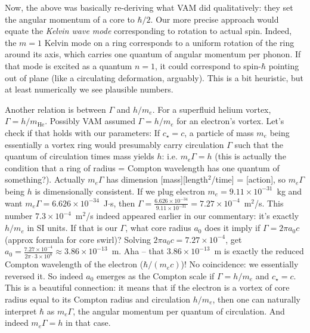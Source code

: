 \documentclass[12pt]{article}
\begin{document}
Now, the above was basically re-deriving what VAM did qualitatively: they set the angular momentum of a core to $\hbar/2$. Our more precise approach would equate the \textit{Kelvin wave mode} corresponding to rotation to actual spin. Indeed, the $m=1$ Kelvin mode on a ring corresponds to a uniform rotation of the ring around its axis, which carries one quantum of angular momentum per phonon. If that mode is excited as a quantum $n=1$, it could correspond to spin-$\hbar$ pointing out of plane (like a circulating deformation, arguably). This is a bit heuristic, but at least numerically we see plausible numbers.

Another relation is between $\Gamma$ and $h/m_e$. For a superfluid helium vortex, $\Gamma = h/m_{\text{He}}$. Possibly VAM assumed $\Gamma = h/m_e$ for an electron’s vortex. Let’s check if that holds with our parameters: If $c_\star = c$, a particle of mass $m_e$ being essentially a vortex ring would presumably carry circulation $\Gamma$ such that the quantum of circulation times mass yields $h$: i.e. $m_e \Gamma = h$ (this is actually the condition that a ring of radius = Compton wavelength has one quantum of something?). Actually $m_e \Gamma$ has dimension [mass][length$^2$/time] = [action], so $m_e \Gamma$ being $h$ is dimensionally consistent. If we plug electron $m_e = 9.11\times10^{-31}$~kg and want $m_e \Gamma = 6.626\times10^{-34}$~J$\cdot$s, then $\Gamma = \frac{6.626\times10^{-34}}{9.11\times10^{-31}} = 7.27\times10^{-4}$~m$^2$/s. This number $7.3\times10^{-4}$~m$^2$/s indeed appeared earlier in our commentary: it’s exactly $h/m_e$ in SI units. If that is our $\Gamma$, what core radius $a_0$ does it imply if $\Gamma = 2\pi a_0 c$ (approx formula for core swirl)? Solving $2\pi a_0 c = 7.27\times10^{-4}$, get $a_0 = \frac{7.27\times10^{-4}}{2\pi \cdot 3\times10^8} \approx 3.86\times10^{-13}$~m. Aha -- that $3.86\times10^{-13}$~m is exactly the reduced Compton wavelength of the electron ($\hbar/(m_e c)$)! No coincidence: we essentially reversed it. So indeed $a_0$ emerges as the Compton scale if $\Gamma = h/m_e$ and $c_\star=c$. This is a beautiful connection: it means that if the electron is a vortex of core radius equal to its Compton radius and circulation $h/m_e$, then one can naturally interpret $\hbar$ as $m_e \Gamma$, the angular momentum per quantum of circulation. And indeed $m_e \Gamma = h$ in that case.
\end{document}
